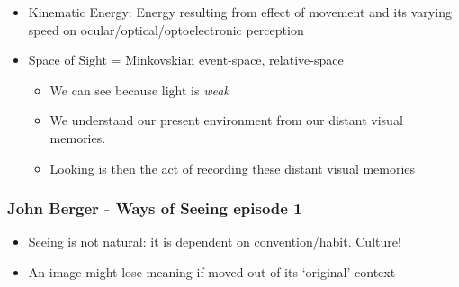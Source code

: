\documentclass[a4paper]{article}
\begin{document}
\begin{itemize}
\begin{itemize}[label=$\circ$]
	\end{itemize}
	\item Kinematic Energy: Energy resulting from effect of movement and its varying speed on ocular/optical/optoelectronic perception
	\item Space of Sight = Minkovskian event-space, relative-space
	\begin{itemize}[label=$\circ$]
		\item We can see because light is \textit{weak}
		\item We understand our present environment from our distant visual memories. 
		\item Looking is then the act of recording these distant visual memories
	\end{itemize}
\end{itemize}

\subsubsection{John Berger - Ways of Seeing episode 1}
\begin{itemize}
	\item Seeing is not natural: it is dependent on convention/habit. Culture!
	\item An image might lose meaning if moved out of its `original' context
\end{itemize}
\end{document}
